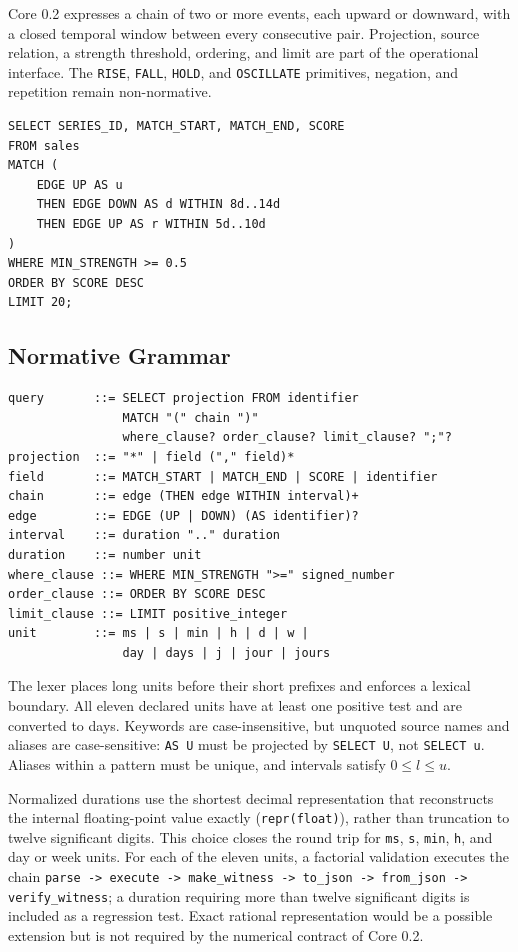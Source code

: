 \documentclass[11pt,a4paper]{article}
\newcommand{\code}[1]{\texttt{#1}}
\begin{document}
Core 0.2 expresses a chain of two or more events, each upward or downward, with a closed temporal window between every consecutive pair. Projection, source relation, a strength threshold, ordering, and limit are part of the operational interface. The \code{RISE}, \code{FALL}, \code{HOLD}, and \code{OSCILLATE} primitives, negation, and repetition remain non-normative.

\begin{lstlisting}
SELECT SERIES_ID, MATCH_START, MATCH_END, SCORE
FROM sales
MATCH (
    EDGE UP AS u
    THEN EDGE DOWN AS d WITHIN 8d..14d
    THEN EDGE UP AS r WITHIN 5d..10d
)
WHERE MIN_STRENGTH >= 0.5
ORDER BY SCORE DESC
LIMIT 20;
\end{lstlisting}

\subsection{Normative Grammar}

\begin{lstlisting}[language={},basicstyle=\ttfamily\footnotesize]
query       ::= SELECT projection FROM identifier
                MATCH "(" chain ")"
                where_clause? order_clause? limit_clause? ";"?
projection  ::= "*" | field ("," field)*
field       ::= MATCH_START | MATCH_END | SCORE | identifier
chain       ::= edge (THEN edge WITHIN interval)+
edge        ::= EDGE (UP | DOWN) (AS identifier)?
interval    ::= duration ".." duration
duration    ::= number unit
where_clause ::= WHERE MIN_STRENGTH ">=" signed_number
order_clause ::= ORDER BY SCORE DESC
limit_clause ::= LIMIT positive_integer
unit        ::= ms | s | min | h | d | w |
                day | days | j | jour | jours
\end{lstlisting}

The lexer places long units before their short prefixes and enforces a lexical boundary. All eleven declared units have at least one positive test and are converted to days. Keywords are case-insensitive, but unquoted source names and aliases are case-sensitive: \code{AS U} must be projected by \code{SELECT U}, not \code{SELECT u}. Aliases within a pattern must be unique, and intervals satisfy $0\leq l\leq u$.

Normalized durations use the shortest decimal representation that reconstructs the internal floating-point value exactly (\code{repr(float)}), rather than truncation to twelve significant digits. This choice closes the round trip for \code{ms}, \code{s}, \code{min}, \code{h}, and day or week units. For each of the eleven units, a factorial validation executes the chain \code{parse -> execute -> make\_witness -> to\_json -> from\_json -> verify\_witness}; a duration requiring more than twelve significant digits is included as a regression test. Exact rational representation would be a possible extension but is not required by the numerical contract of Core 0.2.
\end{document}
